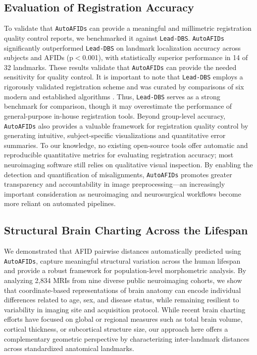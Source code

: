 \subsection{Evaluation of Registration Accuracy}

To validate that \texttt{AutoAFIDs} can provide a meaningful and millimetric registration quality control reports, we benchmarked it against \texttt{Lead-DBS}. \texttt{AutoAFIDs} significantly outperformed \texttt{Lead-DBS} on landmark localization accuracy across subjects and AFIDs (p\(<\)0.001), with statistically superior performance in 14 of 32 landmarks. These results validate that \texttt{AutoAFIDs} can provide the needed sensitivity for quality control. It is important to note that \texttt{Lead-DBS} employs a rigorously validated registration scheme and was curated by comparisons of six modern and established algorithms \cite{Ewert2019-cc}. Thus, \texttt{Lead-DBS} serves as a strong benchmark for comparison, though it may overestimate the performance of general-purpose in-house registration tools. Beyond group-level accuracy, \texttt{AutoAFIDs} also provides a valuable framework for registration quality control by generating intuitive, subject-specific visualizations and quantitative error summaries. To our knowledge, no existing open-source tools offer automatic and reproducible quantitative metrics for evaluating registration accuracy; most neuroimaging software still relies on qualitative visual inspection. By enabling the detection and quantification of misalignments, \texttt{AutoAFIDs} promotes greater transparency and accountability in image preprocessing—an increasingly important consideration as neuroimaging and neurosurgical workflows become more reliant on automated pipelines.

\subsection{Structural Brain Charting Across the Lifespan}
We demonstrated that AFID pairwise distances automatically predicted using \texttt{AutoAFIDs}, capture meaningful structural variation across the human lifespan and provide a robust framework for population-level morphometric analysis. By analyzing 2,834 MRIs from nine diverse public neuroimaging cohorts, we show that coordinate-based representations of brain anatomy can encode individual differences related to age, sex, and disease status, while remaining resilient to variability in imaging site and acquisition protocol. While recent brain charting efforts \cite{Bethlehem2022-ow,Di-Biase2023-nv} have focused on global or regional measures such as total brain volume, cortical thickness, or subcortical structure size, our approach here offers a complementary geometric perspective by characterizing inter-landmark distances across standardized anatomical landmarks.

